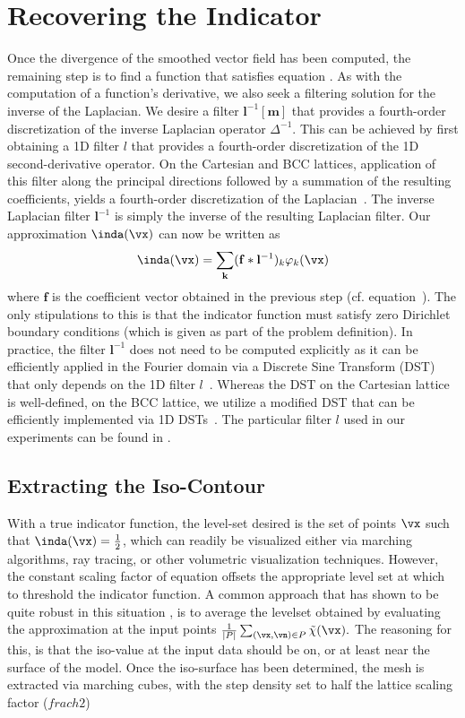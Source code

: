 \section{Recovering the Indicator}
\label{sec:recoveringX}
Once the divergence of the smoothed vector field has been computed, the remaining step is to find a function that satisfies equation . As with the computation of a function's derivative, we also seek a filtering solution for the inverse of the Laplacian. We desire a filter $\mathbf{l}^{-1}[\mathbf{m}]$ that provides a fourth-order discretization of the inverse Laplacian operator $\Delta^{-1}$. This can be achieved by first obtaining a 1D filter $l$ that provides a fourth-order discretization of the 1D second-derivative operator. On the Cartesian and BCC lattices, application of this filter along the principal directions followed by a summation of the resulting coefficients, yields a fourth-order discretization of the Laplacian~\cite{usmanthesis}. The inverse Laplacian filter $\mathbf{l}^{-1}$ is simply the inverse of the resulting Laplacian filter. Our approximation $\inda(\vx)$ can now be written as {\small
\begin{equation}
	\inda(\vx)  = \displaystyle\sum_{\mathbf{k}} (\mathbf{f} \ast \mathbf{l}^{-1})_k\varphi_k(\vx)
\end{equation}}
where $\mathbf{f}$ is the coefficient vector obtained in the previous step (cf. equation~). The only stipulations to this is that the indicator function must satisfy zero Dirichlet boundary conditions (which is given as part of the problem definition). In practice, the filter $\mathbf{l}^{-1}$ does not need to be computed explicitly as it can be efficiently applied in the Fourier domain via a Discrete Sine Transform (DST) that only depends on the 1D filter $l$~\cite[Chapter 4]{usmanthesis}. Whereas the DST on the Cartesian lattice is well-defined, on the BCC lattice, we utilize a  modified DST that can be efficiently implemented via 1D DSTs~\cite{bccdst}. The particular filter $l$ used in our experiments can be found in .

\subsection{Extracting the Iso-Contour}\label{sec:levelset}
With a true indicator function, the level-set desired is the set of points $\vx$ such that $\inda(\vx) = \frac{1}{2}$, which can readily be visualized either via marching algorithms, ray tracing, or other volumetric visualization techniques. However, the constant scaling factor of equation  offsets the appropriate level set at which to threshold the indicator function. A common approach that has shown to be quite robust in this situation \cite{fftk}, is to average the levelset obtained by evaluating the approximation at the input points $\frac{1}{|P|}\sum_{(\vx,\vn)\in P}{\tilde{\chi}(\vx)}.$ The reasoning for this, is that the iso-value at the input data should be on, or at least near the surface of the model. Once the iso-surface has been determined, the mesh is extracted via marching cubes, with the step density set to half the lattice scaling factor ($frac{h}{2}$) \cite{}
